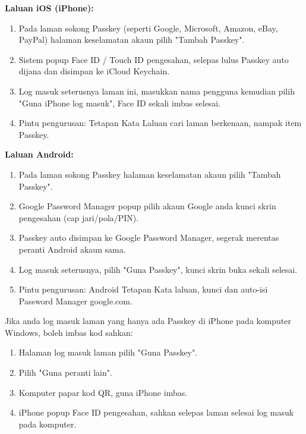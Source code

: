 
\textbf{Laluan iOS (iPhone):}

\begin{enumerate}
  \item Pada laman sokong Passkey (seperti Google, Microsoft, Amazon, eBay, PayPal) halaman keselamatan akaun pilih "Tambah Passkey".
  \item Sistem popup Face ID / Touch ID pengesahan, selepas lulus Passkey auto dijana dan disimpan ke iCloud Keychain.
  \item Log masuk seterusnya laman ini, masukkan nama pengguna kemudian pilih "Guna iPhone log masuk", Face ID sekali imbas selesai.
  \item Pintu pengurusan: Tetapan Kata Laluan cari laman berkenaan, nampak item Passkey.
\end{enumerate}

\textbf{Laluan Android:}

\begin{enumerate}
  \item Pada laman sokong Passkey halaman keselamatan akaun pilih "Tambah Passkey".
  \item Google Password Manager popup pilih akaun Google anda kunci skrin pengesahan (cap jari/pola/PIN).
  \item Passkey auto disimpan ke Google Password Manager, segerak merentas peranti Android akaun sama.
  \item Log masuk seterusnya, pilih "Guna Passkey", kunci skrin buka sekali selesai.
  \item Pintu pengurusan: Android Tetapan Kata laluan, kunci dan auto-isi Password Manager google.com.
\end{enumerate}


Jika anda log masuk laman yang hanya ada Passkey di iPhone pada komputer Windows, boleh imbas kod sahkan:

\begin{enumerate}
  \item Halaman log masuk laman pilih "Guna Passkey".
  \item Pilih "Guna peranti lain".
  \item Komputer papar kod QR, guna iPhone imbas.
  \item iPhone popup Face ID pengesahan, sahkan selepas laman selesai log masuk pada komputer.
\end{enumerate}

